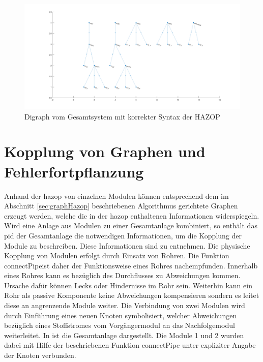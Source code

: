 \begin{figure}[h!tb]
\centering
\includegraphics[width=\textwidth]{bilder/04_code_Sys1.png}
\caption[Digraphen aller Module]{Digraph vom Gesamtsystem mit korrekter Syntax der HAZOP}
\label{fig:graph_sysGes}
\end{figure}

\section{Kopplung von Graphen und Fehlerfortpflanzung}\label{sec:kopplung}
Anhand der \ac{hazop} von einzelnen Modulen k\"onnen entsprechend dem im Abschnitt \ref{sec:graphHazop} beschriebenen Algorithmus gerichtete Graphen erzeugt werden, welche die in der \ac{hazop} enthaltenen Informationen widerspiegeln. Wird eine Anlage aus Modulen zu einer Gesamtanlage kombiniert, so enth\"alt das \ac{pid} der Gesamtanlage die notwendigen Informationen, um die Kopplung der Module zu beschreiben. Diese Informationen sind  zu entnehmen. \newline
Die physische Kopplung von Modulen erfolgt durch Einsatz von Rohren. Die Funktion \glqq connectPipe\grqq { }ist daher der Funktionsweise eines Rohres nachempfunden. Innerhalb eines Rohres kann es bez\"uglich des Durchflusses zu Abweichungen kommen. Ursache daf\"ur k\"onnen Lecks oder Hindernisse im Rohr sein. Weiterhin kann ein Rohr als passive Komponente keine Abweichungen kompensieren sondern es leitet diese an angrenzende Module weiter. Die Verbindung von zwei Modulen wird durch Einf\"uhrung eines neuen Knoten symbolisiert, welcher Abweichungen bez\"uglich eines Stoffstromes vom Vorg\"angermodul an das Nachfolgemodul weiterleitet. In  ist die Gesamtanlage dargestellt. Die Module 1 und 2 wurden dabei  mit Hilfe der beschriebenen Funktion \glqq connectPipe\grqq { } unter expliziter Angabe der Knoten verbunden. 

